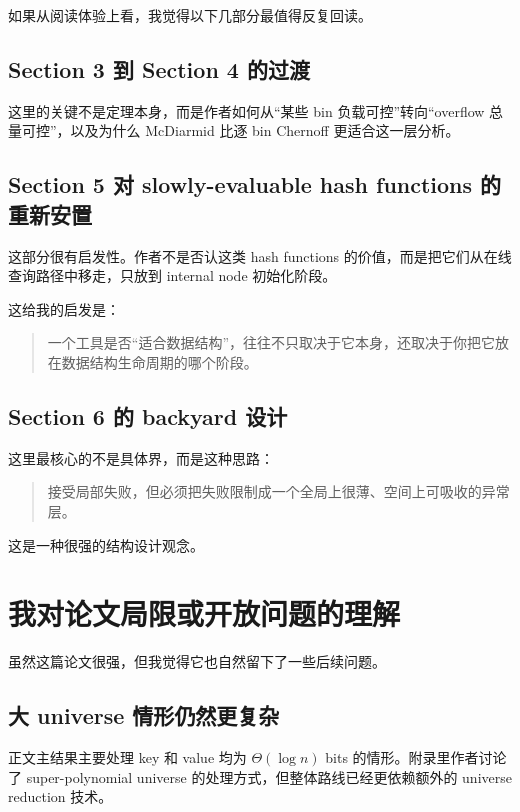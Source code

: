\documentclass[12pt]{article}
\begin{document}
如果从阅读体验上看，我觉得以下几部分最值得反复回读。

\subsection{Section 3 到 Section 4 的过渡}

这里的关键不是定理本身，而是作者如何从“某些 bin 负载可控”转向“overflow 总量可控”，以及为什么 McDiarmid 比逐 bin Chernoff 更适合这一层分析。

\subsection{Section 5 对 slowly-evaluable hash functions 的重新安置}

这部分很有启发性。作者不是否认这类 hash functions 的价值，而是把它们从在线查询路径中移走，只放到 internal node 初始化阶段。

这给我的启发是：

\begin{quote}一个工具是否“适合数据结构”，往往不只取决于它本身，还取决于你把它放在数据结构生命周期的哪个阶段。\end{quote}

\subsection{Section 6 的 backyard 设计}

这里最核心的不是具体界，而是这种思路：

\begin{quote}接受局部失败，但必须把失败限制成一个全局上很薄、空间上可吸收的异常层。\end{quote}

这是一种很强的结构设计观念。

\section{我对论文局限或开放问题的理解}

虽然这篇论文很强，但我觉得它也自然留下了一些后续问题。

\subsection{大 universe 情形仍然更复杂}

正文主结果主要处理 key 和 value 均为 \(\Theta(\log n)\) bits 的情形。附录里作者讨论了 super-polynomial universe 的处理方式，但整体路线已经更依赖额外的 universe reduction 技术\cite[Appendix~A]{kuszmaul2022}。
\end{document}
